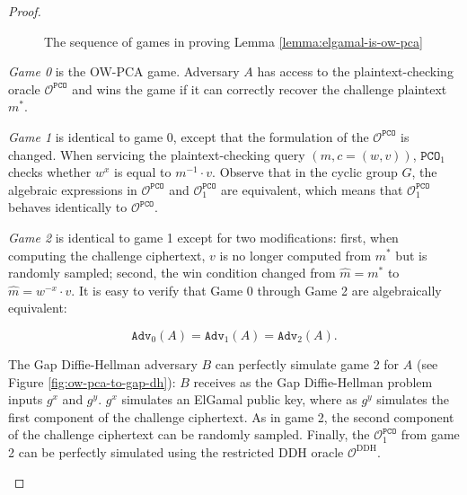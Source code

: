 \documentclass[runningheads]{llncs}
\newcommand{\pco}{\texttt{PCO}}
\newcommand{\adv}{\texttt{Adv}}
\begin{document}
\begin{proof}
\begin{figure}[h]
        \caption{ The sequence of games in proving Lemma \ref{lemma:elgamal-is-ow-pca}}\label{fig:elgamal-pca-games}
    \end{figure}

    \emph{Game 0} is the OW-PCA game. Adversary $A$ has access to the plaintext-checking oracle $\mathcal{O}^\pco$ and wins the game if it can correctly recover the challenge plaintext $m^\ast$.

    \emph{Game 1} is identical to game 0, except that the formulation of the $\mathcal{O}^\pco$ is changed. When servicing the plaintext-checking query $(m, c = (w, v))$, $\pco_1$ checks whether $w^x$ is equal to $m^{-1} \cdot v$. Observe that in the cyclic group $G$, the algebraic expressions in $\mathcal{O}^\pco$ and $\mathcal{O}^\pco_1$ are equivalent, which means that $\mathcal{O}^\pco_1$ behaves identically to $\mathcal{O}^\pco$.

    \emph{Game 2} is identical to game 1 except for two modifications: first, when computing the challenge ciphertext, $v$ is no longer computed from $m^\ast$ but is randomly sampled; second, the win condition changed from $\hat{m} = m^\ast$ to $\hat{m} = w^{-x}\cdot v$. It is easy to verify that Game 0 through Game 2 are algebraically equivalent:

    \begin{equation*}
        \adv_0(A) = \adv_1(A) = \adv_2(A). 
    \end{equation*}

    The Gap Diffie-Hellman adversary $B$ can perfectly simulate game 2 for $A$ (see Figure \ref{fig:ow-pca-to-gap-dh}): $B$ receives as the Gap Diffie-Hellman problem inputs $g^x$ and $g^y$. $g^x$ simulates an ElGamal public key, where as $g^y$ simulates the first component of the challenge ciphertext. As in game 2, the second component of the challenge ciphertext can be randomly sampled. Finally, the $\mathcal{O}^\pco_1$ from game 2 can be perfectly simulated using the restricted DDH oracle $\mathcal{O}^\text{DDH}$.

    \begin{figure}[h]
        \centering


\end{figure}
\end{proof}
\end{document}
